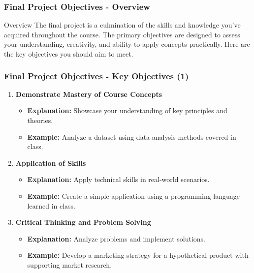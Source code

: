 \documentclass{beamer}
\begin{document}
\begin{frame}[fragile]
    \frametitle{Final Project Objectives - Overview}
    \begin{block}{Overview}
        The final project is a culmination of the skills and knowledge you’ve acquired throughout the course. The primary objectives are designed to assess your understanding, creativity, and ability to apply concepts practically. Here are the key objectives you should aim to meet.
    \end{block}
\end{frame}

\begin{frame}[fragile]
    \frametitle{Final Project Objectives - Key Objectives (1)}
    \begin{enumerate}
        \item \textbf{Demonstrate Mastery of Course Concepts}
        \begin{itemize}
            \item \textbf{Explanation:} Showcase your understanding of key principles and theories.
            \item \textbf{Example:} Analyze a dataset using data analysis methods covered in class.
        \end{itemize}
        
        \item \textbf{Application of Skills}
        \begin{itemize}
            \item \textbf{Explanation:} Apply technical skills in real-world scenarios.
            \item \textbf{Example:} Create a simple application using a programming language learned in class.
        \end{itemize}

        \item \textbf{Critical Thinking and Problem Solving}
        \begin{itemize}
            \item \textbf{Explanation:} Analyze problems and implement solutions.
            \item \textbf{Example:} Develop a marketing strategy for a hypothetical product with supporting market research.
        \end{itemize}
    \end{enumerate}
\end{frame}
\end{document}
